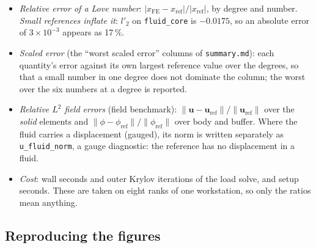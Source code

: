 \documentclass[11pt]{article}
\numberwithin{equation}{section}
\newcommand{\vu}{\mathbf{u}}
\newcommand{\code}[1]{\texttt{#1}}
\begin{document}
\begin{itemize}[leftmargin=*]
\item \emph{Relative error of a Love number}: $|x_{\text{FE}}-x_{\text{ref}}|/|x_{\text{ref}}|$,
  by degree and number. \emph{Small references inflate it}: $l'_2$ on
  \code{fluid\_core} is $-0.0175$, so an absolute error of $3\times10^{-3}$
  appears as 17\,\%.
\item \emph{Scaled error} (the ``worst scaled error'' columns of
  \code{summary.md}): each quantity's error against its own largest
  reference value over the degrees, so that a small number in one degree
  does not dominate the column; the worst over the six numbers at a degree
  is reported.
\item \emph{Relative $L^2$ field errors} (field benchmark):
  $\|\vu-\vu_{\text{ref}}\|/\|\vu_{\text{ref}}\|$ over the \emph{solid}
  elements and $\|\phi-\phi_{\text{ref}}\|/\|\phi_{\text{ref}}\|$ over body
  and buffer. Where the fluid carries a displacement (gauged), its norm is
  written separately as \code{u\_fluid\_norm}, a gauge diagnostic: the
  reference has no displacement in a fluid.
\item \emph{Cost}: wall seconds and outer Krylov iterations of the load
  solve, and setup seconds. These are taken on eight ranks of one
  workstation, so only the ratios mean anything.
\end{itemize}

\subsection{Reproducing the figures}
\label{sec:reproduce}
\end{document}
